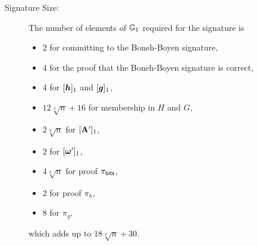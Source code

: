 
\begin{description}
\item[Signature Size:] The number of elements of $\mathbb{G}_1$ required  for the signature is
\begin{itemize}
\item 2 for committing to the Boneh-Boyen signature,
\item 4 for the proof that the Boneh-Boyen signature is correct,
\item 4 for $[{\boldsymbol{h}}]_1$ and $[{\boldsymbol{g}}]_1$,
\item $12\sqrt[3]{n} + 16$ for membership in $H$ and $G$,
\item $2\sqrt[3]{n}$ for $[\mathbf{{A'}}]_1$,
\item $2$ for $[{\boldsymbol{\omega}}']_1$,
\item $4\sqrt[3]{n}$ for proof  $\pi_{\mathsf{bits}}$,
\item $2$ for proof $\pi_h$,
\item $8$ for $\pi_g$,
\end{itemize}
which adds up to $18\sqrt[3]{n} + 30$.


\end{description}
